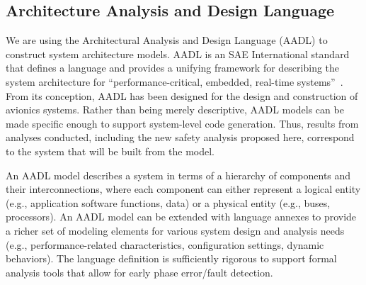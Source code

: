 \subsection{Architecture Analysis and Design Language}
We are using the Architectural Analysis and Design Language (AADL) to construct system architecture models.  AADL is an SAE International standard that defines a language and provides a unifying framework for describing the system architecture for ``performance-critical, embedded, real-time systems''~\cite{AADL_Standard,FeilerModelBasedEngineering2012}. From its conception, AADL has been designed for the design and construction of avionics systems.  Rather than being merely descriptive, AADL models can be made specific enough to support system-level code generation.  Thus, results from analyses conducted, including the new safety analysis proposed here, correspond to the system that will be built from the model.  

An AADL model describes a system in terms of a hierarchy of components and their interconnections, where each component can either represent a logical entity (e.g., application software functions, data) or a physical entity (e.g., buses, processors). An AADL model can be extended with language annexes to provide a richer set of modeling elements for various system design and analysis needs (e.g., performance-related characteristics, configuration settings, dynamic behaviors). The language definition is sufficiently rigorous to support formal analysis tools that allow for early phase error/fault detection.

